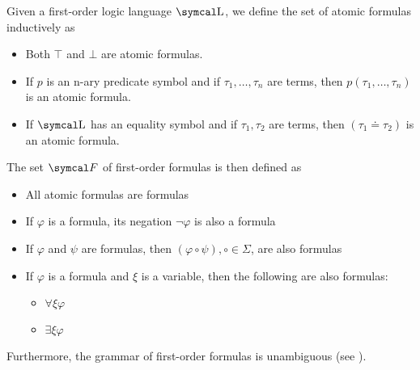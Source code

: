 \begin{definition}\label{def:first_order_formula}\cite[189]{OpenLogic20201202}
  Given a first-order logic language \( \CL \), we define the set of atomic formulas inductively as
  \begin{itemize}
    \item Both \( \top \) and \( \bot \) are atomic formulas.
    \item If \( p \) is an n-ary predicate symbol and if \( \tau_1, \ldots, \tau_n \) are terms, then \( p(\tau_1, \ldots, \tau_n) \) is an atomic formula.
    \item If \( \CL \) has an equality symbol and if \( \tau_1, \tau_2 \) are terms, then \( (\tau_1 \doteq \tau_2) \) is an atomic formula.
  \end{itemize}

  The set \( \Cal{F} \) of first-order formulas is then defined as
  \begin{itemize}
    \item All atomic formulas are formulas
    \item If \( \varphi \) is a formula, its negation \( \neg \varphi \) is also a formula
    \item If \( \varphi \) and \( \psi \) are formulas, then \( (\varphi \circ \psi), \circ \in \Sigma \), are also formulas
    \item If \( \varphi \) is a formula and \( \xi \) is a variable, then the following are also formulas:
    \begin{itemize}
      \item \( \forall \xi \varphi \)
      \item \( \exists \xi \varphi \)
    \end{itemize}
  \end{itemize}

  Furthermore, the grammar of first-order formulas is unambiguous (see ).


\end{definition}
